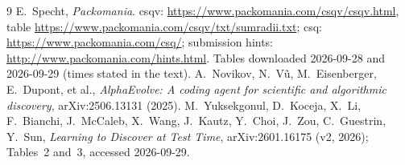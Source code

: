 \documentclass[10pt]{article}
\begin{document}
\begin{thebibliography}{9}
 E.~Specht, \emph{Packomania}. csqv: \url{https://www.packomania.com/csqv/csqv.html}, table \url{https://www.packomania.com/csqv/txt/sumradii.txt}; csq: \url{https://www.packomania.com/csq/}; submission hints: \url{http://www.packomania.com/hints.html}. Tables downloaded 2026-09-28 and 2026-09-29 (times stated in the text).
 A.~Novikov, N.~V\~u, M.~Eisenberger, E.~Dupont, et al., \emph{AlphaEvolve: A coding agent for scientific and algorithmic discovery}, arXiv:2506.13131 (2025).
 M.~Yuksekgonul, D.~Koceja, X.~Li, F.~Bianchi, J.~McCaleb, X.~Wang, J.~Kautz, Y.~Choi, J.~Zou, C.~Guestrin, Y.~Sun, \emph{Learning to Discover at Test Time}, arXiv:2601.16175 (v2, 2026); Tables~2 and~3, accessed 2026-09-29.
\end{thebibliography}
\end{document}

